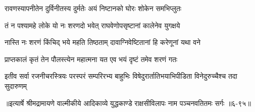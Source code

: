 \twolineshloka
{रावणस्यापनीतेन दुर्विनीतस्य दुर्मतेः}
{अयं निष्टानको घोरः शोकेन समभिप्लुतः} %

\twolineshloka
{तं न पश्यामहे लोके यो नः शरणदो भवेत्}
{राघवेणोपसृष्टानां कालेनेव युगक्षये} %

\twolineshloka
{नास्ति नः शरणं किंचिद् भये महति तिष्ठताम्}
{दावाग्निवेष्टितानां हि करेणूनां यथा वने} %

\twolineshloka
{प्राप्तकालं कृतं तेन पौलस्त्येन महात्मना}
{यत एव भयं दृष्टं तमेव शरणं गतः} %

\twolineshloka
{इतीव सर्वा रजनीचरस्त्रियः परस्परं सम्परिरभ्य बाहुभिः}
{विषेदुरार्तातिभयाभिपीडिता विनेदुरुच्चैश्च तदा सुदारुणम्} %


॥इत्यार्षे श्रीमद्रामायणे वाल्मीकीये आदिकाव्ये युद्धकाण्डे राक्षसीविलापः नाम पञ्चनवतितमः सर्गः ॥६-९५॥
